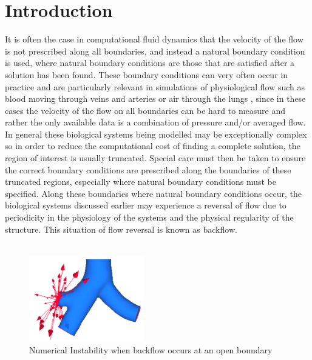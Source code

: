 \chapter{Introduction}

It is often the case in computational fluid dynamics that the velocity of the flow is not prescribed along all boundaries, and instead a natural boundary condition is used, where natural boundary conditions are those that are satisfied after a solution has been found. These boundary conditions can very often occur in practice and are particularly relevant in simulations of physiological flow such as blood moving through veins and arteries or air through the lungs \cite{bertoglio2017}, since in these cases the velocity of the flow on all boundaries can be hard to measure and rather the only available data is a combination of pressure and/or averaged flow. In general these biological systems being modelled may be exceptionally complex so in order to reduce the computational cost of finding a complete solution, the region of interest is usually truncated. Special care must then be taken to ensure the correct boundary conditions are prescribed along the boundaries of these truncated regions, especially where natural boundary conditions must be specified. Along these boundaries where natural boundary conditions occur, the biological systems discussed earlier may experience a reversal of flow due to periodicity in the physiology of the systems and the physical regularity of the structure. This situation of flow reversal is known as backflow.\\
\\
\begin{figure}[t]
\centering
\includegraphics[width=5cm]{media/instability.PNG}
\caption{Numerical Instability when backflow occurs at an open boundary\label{fig:instab}}
\end{figure}

